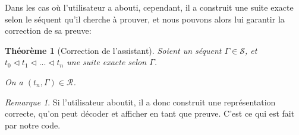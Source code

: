 \documentclass[11pt,a4paper]{article}
\theoremstyle{plain}
\newtheorem{theorem}{Théorème}
\theoremstyle{definition}
\theoremstyle{remark}
\newtheorem{remark}{Remarque}
\newcommand*{\sequent}{\Gamma}
\newcommand*{\sequents}{\ensuremath{\mathcal{S}}}
\newcommand*{\representations}{\ensuremath{\mathcal{R}}}
\newcommand*{\relapprox}{\ensuremath{\triangleleft}}
\begin{document}
Dans les cas où l'utilisateur a abouti, cependant, il a construit une suite exacte selon le séquent qu'il cherche à prouver, et nous pouvons alors lui garantir la correction de sa preuve: 

\begin{theorem}[Correction de l'assistant]
    Soient un séquent $\sequent \in \sequents$, et $t_0 \relapprox t_1 \relapprox ... \relapprox t_n$ une suite exacte selon $\sequent$.

    On a $(t_n, \sequent) \in \representations$.
\end{theorem}

\begin{remark}
    Si l'utilisateur aboutit, il a donc construit une représentation correcte, qu'on peut décoder et afficher en tant que preuve. C'est ce qui est fait par notre code.
\end{remark}
\end{document}
